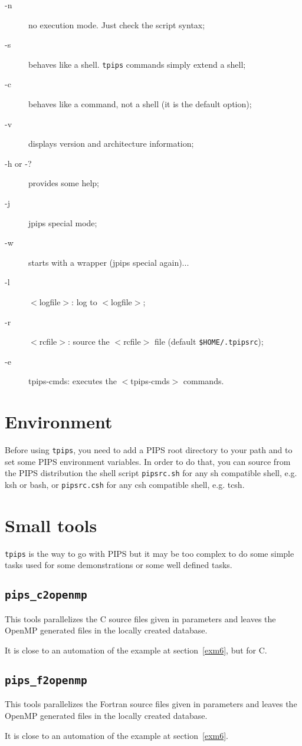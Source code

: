 \documentclass[a4paper]{article}
\begin{document}
\begin{description}

\item [-n]  no execution mode. Just check the script syntax;
\item [-s] behaves like a shell. {\tt tpips} commands simply extend a shell;
\item [-c] behaves like a command, not a shell (it is the default option);
\item [-v] displays version and architecture information;
\item [-h or -?] provides some help;
\item [-j] jpips special mode;
\item [-w] starts with a wrapper (jpips special again)...
\item [-l] $<$logfile$>$: log to $<$logfile$>$;
\item [-r] $<$rcfile$>$: source the $<$rcfile$>$ file (default
  \verb|$HOME/.tpipsrc|); %
\item [-e] tpips-cmds: executes the $<$tpips-cmds$>$ commands.
\end{description}


\section{Environment}

Before using {\tt tpips}, you need to add a PIPS root directory to your
path and to set some PIPS environment variables. In order to do that, you
can source from the PIPS distribution the shell script \texttt{pipsrc.sh}
for any sh compatible shell, e.g. ksh or bash, or \texttt{pipsrc.csh} for
any csh compatible shell, e.g.  tcsh.


\section{Small tools}
\label{sec:small-tools}

\texttt{tpips} is the way to go with PIPS but it may be too complex to do
some simple tasks used for some demonstrations or some well defined tasks.


\subsection{\texttt{pips\_c2openmp}}
\label{sec:pips_f2openmp}

This tools parallelizes the C source files given in parameters and leaves
the OpenMP generated files in the locally created database.

It is close to an automation of the example at section~\ref{exm6}, but for
C.

\subsection{\texttt{pips\_f2openmp}}
\label{sec:pips_f2openmp}

This tools parallelizes the Fortran source files given in parameters and
leaves the OpenMP generated files in the locally created database.

It is close to an automation of the example at section~\ref{exm6}.
\end{document}
